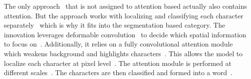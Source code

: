 The only approach~\citep{liao_scene_2018} that is not assigned to attention based actually also
contains attention.
But the approach works with localizing and classifying each character
separately~\citep{liao_scene_2018} which is why it fits into the segmentation based category.
The innovation leverages deformable convolution~\citep{dai_deformable_2017} to decide
which spatial information to focus on~\citep{liao_scene_2018}.
Additionally, it relies on a fully convolutional attention module which weakens background and
highlights characters~\citep{liao_scene_2018}.
This allows the model to localize each character at pixel level~\citep{liao_scene_2018}.
The attention module is performed at different scales~\citep{liao_scene_2018,xu_show_2016}.
The characters are then classified and formed into a word~\citep{liao_scene_2018}.

